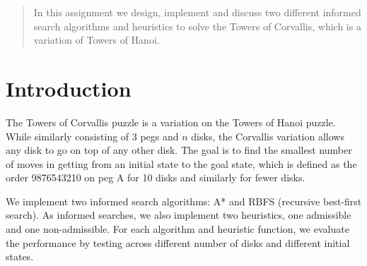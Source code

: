 \documentclass[12pt]{article}
\begin{document}
\maketitle

\begin{abstract}
In this assignment we design, implement and discuss two different informed search algorithms and heuristics to solve the Towers of Corvallis, which is a variation of Towers of Hanoi. 
\end{abstract}

\section{Introduction}

The Towers of Corvallis puzzle is a variation on the Towers of Hanoi puzzle. While similarly consisting of 3 pegs and $n$ disks, the Corvallis variation allows any disk to go on top of any other disk. The goal is to find the smallest number of moves in getting from an initial state to the goal state, which is defined as the order 9876543210 on peg A for 10 disks and similarly for fewer disks.

We implement two informed search algorithms: A* and RBFS (recursive best-first search). As informed searches, we also implement two heuristics, one admissible and one non-admissible. For each algorithm and heuristic function, we evaluate the performance by testing across different number of disks and different initial states.








\end{document}
